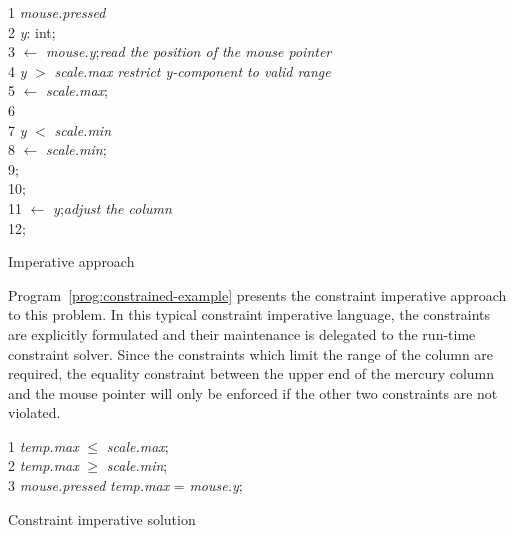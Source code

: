 %
\begin{Program}
\begin{ttlprog}
1\>\ttlWhile{} {\em mouse.pressed} \ttlDo{}\\
2\>\>\ttlVar{} {\em y}: int;\\
3\> $\leftarrow$ {\em mouse.y};\`{\em read the position of the mouse pointer}\\
4\>\>\ttlIf{} {\em y} $>$ {\em scale.max} \ttlThen{}\`{\em restrict y-component to valid range}\\
5\>\> $\leftarrow$ {\em scale.max};\\
6\>\>\ttlElse{}\\
7\>\>\>\ttlIf{} {\em y} $<$ {\em scale.min} \ttlThen{}\\
8\>\>\> $\leftarrow$ {\em scale.min};\\
9\>\>\>\ttlEnd{};\\
10\>\>\ttlEnd{};\\
11\> $\leftarrow$ {\em y};\`{\em adjust the column}\\
12\>\ttlEnd{};
\end{ttlprog}
\caption{Imperative approach}
\label{prog:imperative-example}
\end{Program}
%
Program~\ref{prog:constrained-example} presents the constraint
imperative approach to this problem.  In this typical constraint
imperative language, the constraints are explicitly formulated and
their maintenance is delegated to the run-time constraint solver.
Since the constraints which limit the range of the column are
required, the equality constraint between the upper end of the mercury
column and the mouse pointer will only be enforced if the other two
constraints are not violated.
%
\begin{Program}
\begin{ttlprog}
1\>\ttlRequire{} {\em temp.max} $\leq$ {\em scale.max};\\
2\>\ttlRequire{} {\em temp.max} $\geq$ {\em scale.min};\\
3\>\ttlWhile{} {\em mouse.pressed} \ttlPrefer{} {\em temp.max} = {\em mouse.y};
\end{ttlprog}
\caption{Constraint imperative solution}
\label{prog:constrained-example}
\end{Program}

